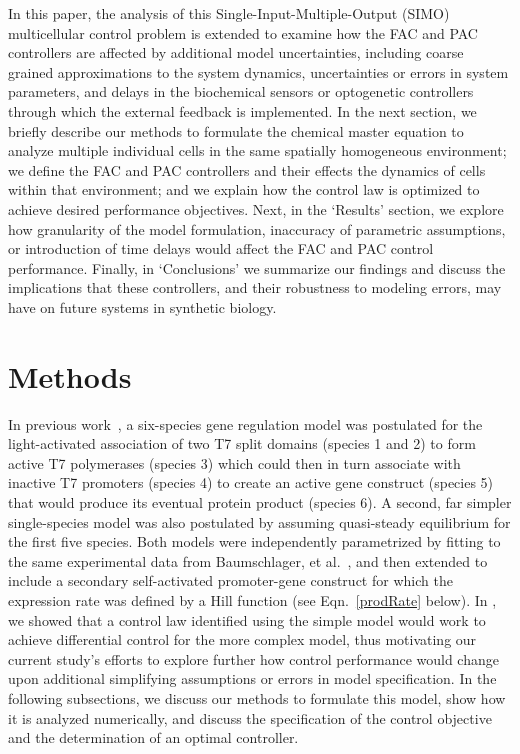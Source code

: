 \documentclass[12pt]{article}
\begin{document}
In this paper, the analysis of this Single-Input-Multiple-Output (SIMO) multicellular control problem is extended to examine how the FAC and PAC controllers are affected by additional model uncertainties, including coarse grained approximations to the system dynamics, uncertainties or errors in system parameters, and delays in the biochemical sensors or optogenetic controllers through which the external feedback is implemented. In the next section, we briefly describe our methods to formulate the chemical master equation to analyze multiple individual cells in the same spatially homogeneous environment; we define the FAC and PAC controllers and their effects the dynamics of cells within that environment; and we explain how the control law is optimized to achieve desired performance objectives. Next, in the `Results' section, we explore how granularity of the model formulation, inaccuracy of parametric assumptions, or introduction of time delays would affect the FAC and PAC control performance. Finally, in `Conclusions' we summarize our findings and discuss the implications that these controllers, and their robustness to modeling errors, may have on future systems in synthetic biology.

\section{Methods}
In previous work~\cite{May2021}, a six-species gene regulation model was postulated for the light-activated association of two T7 split domains (species 1 and 2) to form active T7 polymerases (species 3) which could then in turn associate with inactive T7 promoters (species 4) to create an active gene construct (species 5) that would produce its eventual protein product (species 6). A second, far simpler single-species model was also postulated by assuming quasi-steady equilibrium for the first five species. Both models were independently parametrized by fitting to the same experimental data from Baumschlager, et al.~\cite{XXX}, and then extended to include a secondary self-activated promoter-gene construct for which the expression rate was defined by a Hill function (see Eqn.\ \ref{prodRate} below). In \cite{May2021}, we showed that a control law identified using the simple model would work to achieve differential control for the more complex model, thus motivating our current study's efforts to explore further how control performance would change upon additional simplifying assumptions or errors in model specification.  In the following subsections, we discuss our methods to formulate this model, show how it is analyzed numerically, and discuss the specification of the control objective and the determination of an optimal controller.
\end{document}
